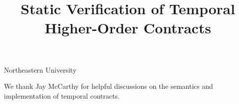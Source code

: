 \documentclass[preprint,onecolumn,9pt]{sigplanconf} %
\begin{document}
\copyrightdata{[to be supplied]}
\title{Static Verification of Temporal Higher-Order Contracts}

           {Northeastern University}
           {}

\maketitle
\begin{abstract}

\end{abstract}



\acks We thank Jay McCarthy for helpful discussions on the semantics
and implementation of temporal contracts.

\balance

\end{document}
